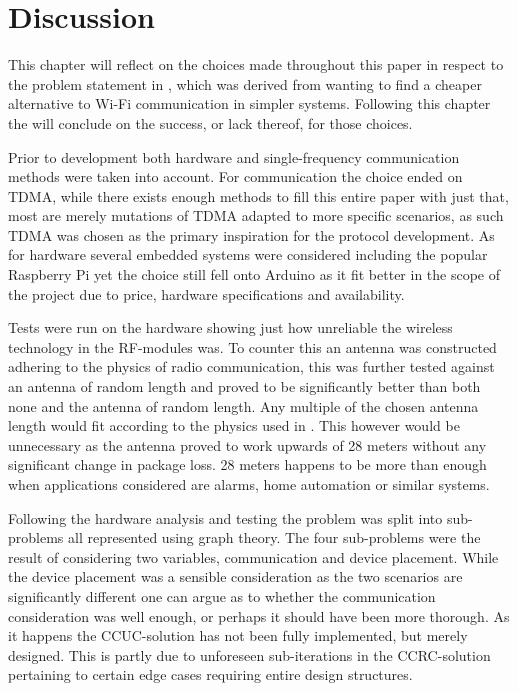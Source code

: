 \chapter{Discussion}\label{Discussion}
This chapter will reflect on the choices made throughout this paper in respect to the problem statement in , which was derived from wanting to find a cheaper alternative to Wi-Fi communication in simpler systems.
Following this chapter the  will conclude on the success, or lack thereof, for those choices.

\bigskip \noindent
Prior to development both hardware and single-frequency communication methods were taken into account.
For communication the choice ended on TDMA, while there exists enough methods to fill this entire paper with just that, most are merely mutations of TDMA adapted to more specific scenarios, as such TDMA was chosen as the primary inspiration for the protocol development.
As for hardware several embedded systems were considered including the popular Raspberry Pi yet the choice still fell onto Arduino as it fit better in the scope of the project due to price, hardware specifications and availability.

Tests were run on the hardware showing just how unreliable the wireless technology in the RF-modules was.
To counter this an antenna was constructed adhering to the physics of radio communication, this was further tested against an antenna of random length and proved to be significantly better than both none and the antenna of random length.
Any multiple of the chosen antenna length would fit according to the physics used in .
This however would be unnecessary as the antenna proved to work upwards of 28 meters without any significant change in package loss.
28 meters happens to be more than enough when applications considered are alarms, home automation or similar systems.

\bigskip \noindent
Following the hardware analysis and testing the problem was split into sub-problems all represented using graph theory.
The four sub-problems were the result of considering two variables, communication and device placement.
While the device placement was a sensible consideration as the two scenarios are significantly different one can argue as to whether the communication consideration was well enough, or perhaps it should have been more thorough.
As it happens the CCUC-solution has not been fully implemented, but merely designed.
This is partly due to unforeseen sub-iterations in the CCRC-solution pertaining to certain edge cases requiring entire design structures.

